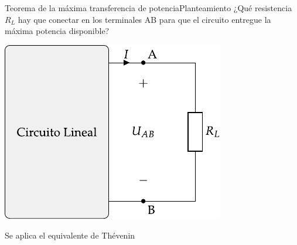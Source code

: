 \documentclass[aspectratio=169, xcolor={usenames,svgnames,dvipsnames}]{beamer}
\begin{document}
\begin{frame}{Teorema de la máxima transferencia de potencia}{Planteamiento}
¿Qué resistencia \(R_L\) hay que conectar en los terminales AB para que el circuito entregue la \alert{máxima potencia disponible}?

\begin{center}
\includegraphics[height=0.55\textheight]{../figs/thevenin_continua_red.pdf}
\end{center}

Se aplica el \alert{equivalente de Thévenin}
\end{frame}
\end{document}
